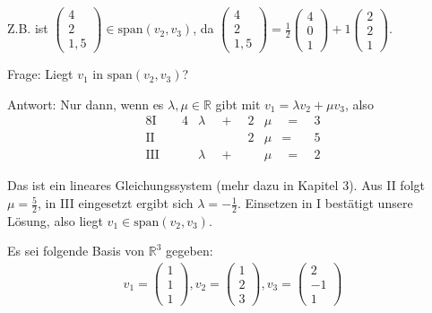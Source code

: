 Z.B. ist $\begin{pmatrix}4\\2\\1,5\end{pmatrix} \in \text{span}(v_2, v_3)$, da $\begin{pmatrix}4\\2\\1,5\end{pmatrix} = \frac{1}{2} \begin{pmatrix}4\\0\\1\end{pmatrix} + 1 \begin{pmatrix}2\\2\\1\end{pmatrix}$.

\vspace{0.3cm}

Frage: Liegt $v_1$ in $\text{span}(v_2,v_3)$?

Antwort: Nur dann, wenn es $\lambda,\mu \in \mathbb{R}$ gibt mit $v_1 = \lambda v_2 + \mu v_3$, also
\begin{alignat*}{8}
\text{I}\quad & 4 & \lambda & \enspace+\enspace & 2 & \mu & \enspace=\enspace & 3 \\
\text{II}\quad &  &         &   & 2 & \mu & = & 5 \\
\text{III}\quad & & \lambda & \enspace+\enspace &   & \mu & \enspace=\enspace & 2
\end{alignat*}

Das ist ein lineares Gleichungssystem (mehr dazu in Kapitel 3). Aus II folgt $\mu = \frac{5}{2}$, in III eingesetzt ergibt sich $\lambda = -\frac{1}{2}$. Einsetzen in I bestätigt unsere Lösung, also liegt $v_1 \in \text{span}(v_2,v_3)$.

\vspace{0.5cm}

Es sei folgende Basis von $\mathbb{R}^3$ gegeben:
\begin{align*}
	v_1 = \begin{pmatrix}1\\1\\1\end{pmatrix}, v_2 = \begin{pmatrix}1\\2\\3\end{pmatrix}, v_3 = \begin{pmatrix}2\\-1\\1\end{pmatrix}
\end{align*}

